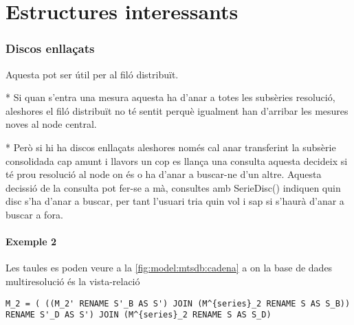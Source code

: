 \section{Estructures interessants}



\subsubsection{Discos enllaçats}


Aquesta pot ser útil per al filó distribuït. 

* Si quan s'entra una mesura aquesta ha d'anar a totes les subsèries resolució, aleshores el filó distribuït no té sentit perquè igualment han d'arribar les mesures noves al node central.

* Però si hi ha discos enllaçats aleshores només cal anar transferint la subsèrie consolidada cap amunt i llavors un cop es llança una consulta aquesta decideix si té prou resolució al node on és o ha d'anar a buscar-ne d'un altre. Aquesta decissió de la consulta pot fer-se a mà, consultes amb SerieDisc()  indiquen quin disc s'ha d'anar a buscar, per tant l'usuari tria quin vol i sap si s'haurà d'anar a buscar a fora. 


\paragraph{Exemple 2}

Les taules es poden veure a la \autoref{fig:model:mtsdb:cadena} a on la base de dades multiresolució és la vista-relació 
\begin{verbatim}
M_2 = ( ((M_2' RENAME S'_B AS S') JOIN (M^{series}_2 RENAME S AS S_B)) RENAME S'_D AS S') JOIN (M^{series}_2 RENAME S AS S_D)
\end{verbatim}



